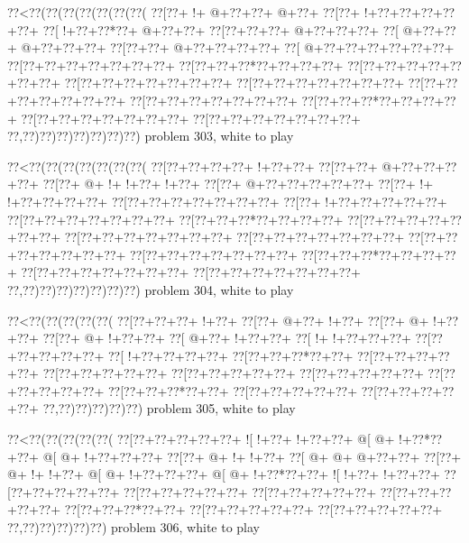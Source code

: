 \vbox{\vbox{\goo
\0??<\0??(\0??(\0??(\0??(\0??(\0??(\0??(
\0??[\0??+\- !+\- @+\0??+\0??+\- @+\0??+
\0??[\0??+\- !+\0??+\0??+\0??+\0??+\0??+
\0??[\- !+\0??+\0??*\0??+\- @+\0??+\0??+
\0??[\0??+\0??+\0??+\- @+\0??+\0??+\0??+
\0??[\- @+\0??+\0??+\- @+\0??+\0??+\0??+
\0??[\0??+\0??+\- @+\0??+\0??+\0??+\0??+
\0??[\- @+\0??+\0??+\0??+\0??+\0??+\0??+
\0??[\0??+\0??+\0??+\0??+\0??+\0??+\0??+
\0??[\0??+\0??+\0??*\0??+\0??+\0??+\0??+
\0??[\0??+\0??+\0??+\0??+\0??+\0??+\0??+
\0??[\0??+\0??+\0??+\0??+\0??+\0??+\0??+
\0??[\0??+\0??+\0??+\0??+\0??+\0??+\0??+
\0??[\0??+\0??+\0??+\0??+\0??+\0??+\0??+
\0??[\0??+\0??+\0??+\0??+\0??+\0??+\0??+
\0??[\0??+\0??+\0??*\0??+\0??+\0??+\0??+
\0??[\0??+\0??+\0??+\0??+\0??+\0??+\0??+
\0??[\0??+\0??+\0??+\0??+\0??+\0??+\0??+
\0??,\0??)\0??)\0??)\0??)\0??)\0??)\0??)
}
\hfil problem 303, white to play\hfil\break
}

\vbox{\vbox{\goo
\0??<\0??(\0??(\0??(\0??(\0??(\0??(\0??(
\0??[\0??+\0??+\0??+\0??+\- !+\0??+\0??+
\0??[\0??+\0??+\- @+\0??+\0??+\0??+\0??+
\0??[\0??+\- @+\- !+\- !+\0??+\- !+\0??+
\0??[\0??+\- @+\0??+\0??+\0??+\0??+\0??+
\0??[\0??+\- !+\- !+\0??+\0??+\0??+\0??+
\0??[\0??+\0??+\0??+\0??+\0??+\0??+\0??+
\0??[\0??+\- !+\0??+\0??+\0??+\0??+\0??+
\0??[\0??+\0??+\0??+\0??+\0??+\0??+\0??+
\0??[\0??+\0??+\0??*\0??+\0??+\0??+\0??+
\0??[\0??+\0??+\0??+\0??+\0??+\0??+\0??+
\0??[\0??+\0??+\0??+\0??+\0??+\0??+\0??+
\0??[\0??+\0??+\0??+\0??+\0??+\0??+\0??+
\0??[\0??+\0??+\0??+\0??+\0??+\0??+\0??+
\0??[\0??+\0??+\0??+\0??+\0??+\0??+\0??+
\0??[\0??+\0??+\0??*\0??+\0??+\0??+\0??+
\0??[\0??+\0??+\0??+\0??+\0??+\0??+\0??+
\0??[\0??+\0??+\0??+\0??+\0??+\0??+\0??+
\0??,\0??)\0??)\0??)\0??)\0??)\0??)\0??)
}
\hfil problem 304, white to play\hfil\break
}

\vbox{\vbox{\goo
\0??<\0??(\0??(\0??(\0??(\0??(
\0??[\0??+\0??+\0??+\- !+\0??+
\0??[\0??+\- @+\0??+\- !+\0??+
\0??[\0??+\- @+\- !+\0??+\0??+
\0??[\0??+\- @+\- !+\0??+\0??+
\0??[\- @+\0??+\- !+\0??+\0??+
\0??[\- !+\- !+\0??+\0??+\0??+
\0??[\0??+\0??+\0??+\0??+\0??+
\0??[\- !+\0??+\0??+\0??+\0??+
\0??[\0??+\0??+\0??*\0??+\0??+
\0??[\0??+\0??+\0??+\0??+\0??+
\0??[\0??+\0??+\0??+\0??+\0??+
\0??[\0??+\0??+\0??+\0??+\0??+
\0??[\0??+\0??+\0??+\0??+\0??+
\0??[\0??+\0??+\0??+\0??+\0??+
\0??[\0??+\0??+\0??*\0??+\0??+
\0??[\0??+\0??+\0??+\0??+\0??+
\0??[\0??+\0??+\0??+\0??+\0??+
\0??,\0??)\0??)\0??)\0??)\0??)
}
\hfil problem 305, white to play\hfil\break
}

\vbox{\vbox{\goo
\0??<\0??(\0??(\0??(\0??(\0??(
\0??[\0??+\0??+\0??+\0??+\0??+
\- ![\- !+\0??+\- !+\0??+\0??+
\- @[\- @+\- !+\0??*\0??+\0??+
\- @[\- @+\- !+\0??+\0??+\0??+
\0??[\0??+\- @+\- !+\- !+\0??+
\0??[\- @+\- @+\- @+\0??+\0??+
\0??[\0??+\- @+\- !+\- !+\0??+
\- @[\- @+\- !+\0??+\0??+\0??+
\- @[\- @+\- !+\0??*\0??+\0??+
\- ![\- !+\0??+\- !+\0??+\0??+
\0??[\0??+\0??+\0??+\0??+\0??+
\0??[\0??+\0??+\0??+\0??+\0??+
\0??[\0??+\0??+\0??+\0??+\0??+
\0??[\0??+\0??+\0??+\0??+\0??+
\0??[\0??+\0??+\0??*\0??+\0??+
\0??[\0??+\0??+\0??+\0??+\0??+
\0??[\0??+\0??+\0??+\0??+\0??+
\0??,\0??)\0??)\0??)\0??)\0??)
}
\hfil problem 306, white to play\hfil\break
}

